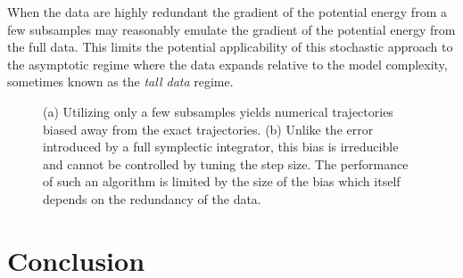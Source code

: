 \documentclass{article}
\begin{document}
When the data are highly redundant the gradient of the potential energy from 
a few subsamples may reasonably emulate the gradient of the potential energy 
from the full data.  This limits the potential applicability of this stochastic approach 
to the asymptotic regime where the data expands relative to the model complexity, 
sometimes known as the \textit{tall data} regime.

\begin{figure}
\centering
{}
\caption{(a) Utilizing only a few subsamples yields numerical trajectories
biased away from the exact trajectories.  (b) Unlike the error introduced by
a full symplectic integrator, this bias is irreducible and cannot be controlled
by tuning the step size.  The performance of such an algorithm is limited by 
the size of the bias which itself depends on the redundancy of the data.}
\label{fig:subsample_trajectory}
\end{figure}

\section{Conclusion}
\end{document}
